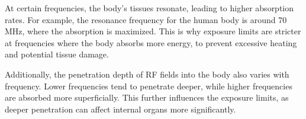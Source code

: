 At certain frequencies, the body's tissues resonate, leading to higher absorption rates. For example, the resonance frequency for the human body is around 70 MHz, where the absorption is maximized. This is why exposure limits are stricter at frequencies where the body absorbs more energy, to prevent excessive heating and potential tissue damage.

Additionally, the penetration depth of RF fields into the body also varies with frequency. Lower frequencies tend to penetrate deeper, while higher frequencies are absorbed more superficially. This further influences the exposure limits, as deeper penetration can affect internal organs more significantly.

